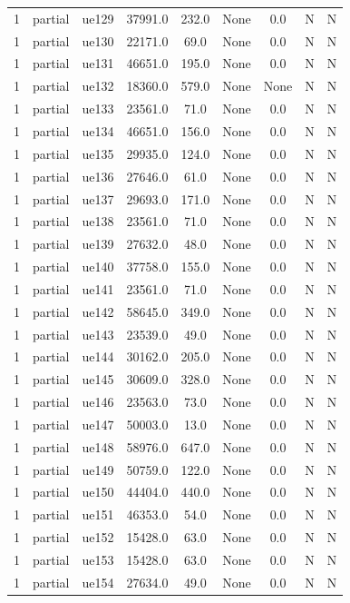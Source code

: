 \begin{table}[ht]
\begin{tabular}{|c|c|c|c|c|c|c|c|c|}
1 & partial & ue129 & 37991.0 & 232.0 & None & 0.0 & N & N \\
1 & partial & ue130 & 22171.0 & 69.0 & None & 0.0 & N & N \\
1 & partial & ue131 & 46651.0 & 195.0 & None & 0.0 & N & N \\
1 & partial & ue132 & 18360.0 & 579.0 & None & None & N & N \\
1 & partial & ue133 & 23561.0 & 71.0 & None & 0.0 & N & N \\
1 & partial & ue134 & 46651.0 & 156.0 & None & 0.0 & N & N \\
1 & partial & ue135 & 29935.0 & 124.0 & None & 0.0 & N & N \\
1 & partial & ue136 & 27646.0 & 61.0 & None & 0.0 & N & N \\
1 & partial & ue137 & 29693.0 & 171.0 & None & 0.0 & N & N \\
1 & partial & ue138 & 23561.0 & 71.0 & None & 0.0 & N & N \\
1 & partial & ue139 & 27632.0 & 48.0 & None & 0.0 & N & N \\
1 & partial & ue140 & 37758.0 & 155.0 & None & 0.0 & N & N \\
1 & partial & ue141 & 23561.0 & 71.0 & None & 0.0 & N & N \\
1 & partial & ue142 & 58645.0 & 349.0 & None & 0.0 & N & N \\
1 & partial & ue143 & 23539.0 & 49.0 & None & 0.0 & N & N \\
1 & partial & ue144 & 30162.0 & 205.0 & None & 0.0 & N & N \\
1 & partial & ue145 & 30609.0 & 328.0 & None & 0.0 & N & N \\
1 & partial & ue146 & 23563.0 & 73.0 & None & 0.0 & N & N \\
1 & partial & ue147 & 50003.0 & 13.0 & None & 0.0 & N & N \\
1 & partial & ue148 & 58976.0 & 647.0 & None & 0.0 & N & N \\
1 & partial & ue149 & 50759.0 & 122.0 & None & 0.0 & N & N \\
1 & partial & ue150 & 44404.0 & 440.0 & None & 0.0 & N & N \\
1 & partial & ue151 & 46353.0 & 54.0 & None & 0.0 & N & N \\
1 & partial & ue152 & 15428.0 & 63.0 & None & 0.0 & N & N \\
1 & partial & ue153 & 15428.0 & 63.0 & None & 0.0 & N & N \\
1 & partial & ue154 & 27634.0 & 49.0 & None & 0.0 & N & N \\

\end{tabular}
\end{table}
